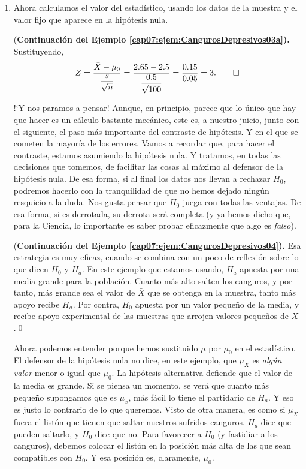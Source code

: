 \begin{enumerate}
     \item Ahora calculamos el valor del estadístico, usando los datos de la muestra y el valor fijo que aparece en la hipótesis nula.
         \begin{ejemplo}{(\bf Continuación del Ejemplo \ref{cap07:ejem:CangurosDepresivos03a}).}
         \label{cap07:ejem:CangurosDepresivos04}
         Sustituyendo,
         \[
         Z=\dfrac{\bar X-\mu_0}{\dfrac{s}{\sqrt{n}}}=
         \dfrac{2.65-2.5}{\dfrac{0.5}{\sqrt{100}}}=\dfrac{0.15}{0.05}=3.\qed
         \]
         \end{ejemplo}
         {!`}Y nos paramos a pensar! Aunque, en principio, parece que lo único que hay que hacer es un cálculo bastante mecánico, este es, a nuestro juicio, junto con el siguiente, el paso más importante del contraste de hipótesis. Y en el que se cometen la mayoría de los errores. Vamos a recordar que, para hacer el contraste, estamos asumiendo la hipótesis nula. Y tratamos, en todas las decisiones que tomemos, de facilitar las cosas al máximo al defensor de la hipótesis nula. De esa forma, si al final los datos nos llevan a rechazar $H_0$, podremos hacerlo con la tranquilidad de que no hemos dejado ningún resquicio a la duda. Nos gusta pensar que $H_0$ juega con todas las ventajas. De esa forma, si es derrotada, su derrota será completa (y ya hemos dicho que, para la Ciencia, lo importante es saber probar eficazmente que algo es {\em falso}).

         \begin{ejemplo}{(\bf Continuación del Ejemplo \ref{cap07:ejem:CangurosDepresivos04}).}
         \label{cap07:ejem:CangurosDepresivos05}
         Esa estrategia es muy eficaz, cuando se combina con un poco de reflexión sobre lo que dicen $H_0$ y $H_a$. En este ejemplo que estamos usando, $H_a$ apuesta por una media grande para la población. Cuanto más alto salten los canguros, y por tanto, más grande sea el valor de $\bar X$ que se obtenga en la muestra, tanto más apoyo recibe $H_a$. Por contra, $H_0$ apuesta por un valor pequeño de la media, y recibe apoyo experimental de las muestras que arrojen valores pequeños de $\bar X$.\qed
         \end{ejemplo}

         Ahora podemos entender porque hemos sustituido $\mu$ por $\mu_0$ en el estadístico. El defensor de la hipótesis nula no dice, en este ejemplo, que $\mu_X$ es {\em algún valor} menor o igual que $\mu_0$. La hipótesis alternativa defiende que el valor de la media es grande. Si se piensa un momento, se verá que cuanto más pequeño supongamos que es $\mu_x$, más fácil lo tiene el partidario de $H_a$. Y eso es justo lo contrario de lo que queremos. Visto de otra manera, es como si $\mu_X$ fuera el listón que tienen que saltar nuestros sufridos canguros. $H_a$ dice que pueden saltarlo, y $H_0$ dice que no. Para favorecer a $H_0$ (y fastidiar a los canguros), debemos colocar el listón en la posición más alta de las que sean compatibles con $H_0$. Y esa posición es, claramente, $\mu_0$.


\end{enumerate}
